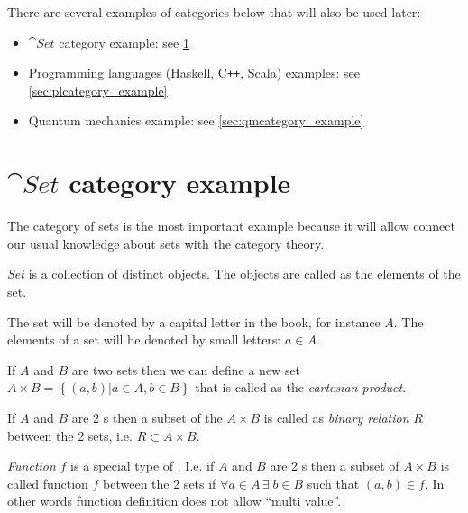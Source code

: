 There are several examples of categories below that will also be used
later:
\begin{itemize}
\item $\cat{Set}$ category example: see \cref{sec:setcategory_example}
\item Programming languages (Haskell, C\texttt{++}, Scala) examples: see
  \cref{sec:plcategory_example}
\item Quantum mechanics example: see \cref{sec:qmcategory_example}
\end{itemize}

\section{$\cat{Set}$ category example}
\label{sec:setcategory_example}
The category of sets is the most important example because it will
allow connect our usual knowledge about sets with the category theory. 

\begin{definition}[Set]
  \label{def:set}
  \textit{Set} is a collection of distinct objects. The objects are called as
  the elements of the set. 

  The set will be denoted by a capital letter in
  the book, for instance $A$. The elements of a set will be denoted by
  small letters: $a \in A$.
\end{definition}

\begin{definition}
  \label{def:cartesian_product}
  If $A$ and $B$ are two sets then we can define a new set $A \times B
  = \left\{(a,b)|a \in A, b \in B\right\}$ that is called as the
  \textit{cartesian product}.
\end{definition}

\begin{definition}
  \label{def:binary_relation}
  If $A$ and $B$ are 2 s then a subset of the
   $A \times B$ is
  called as \textit{binary relation} $R$ between the 2 sets, i.e. $R
  \subset A \times B$. 
\end{definition}

\begin{definition}[Function]
  \label{def:function}
  \textit{Function} $f$ is a special type of . I.e.
  if $A$ and $B$ are 2 s then a subset of $A \times B$ is
  called function $f$ between the 2 sets if $\forall a \in A \, \exists!
  b \in B$ such that $(a,b) \in f$. In other words function definition
  does not allow ``multi value''.
\end{definition}


